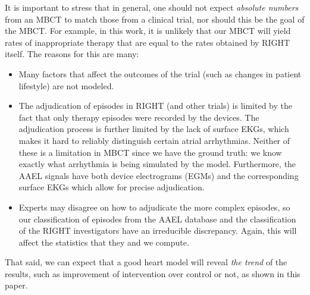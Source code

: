 It is important to stress that in general, one should not expect \emph{absolute numbers} from an MBCT to match those from a clinical trial, nor should this be the goal of the MBCT.
For example, in this work, it is unlikely that our MBCT will yield rates of inappropriate therapy that are equal to the rates obtained by RIGHT itself.
The reasons for this are many:
\begin{itemize}
	\item Many factors that affect the outcomes of the trial (such as changes in patient lifestyle) are not modeled.
	\item The adjudication of episodes in RIGHT (and other trials) is limited by the fact that only therapy episodes were recorded by the devices.
	The adjudication process is further limited by the lack of surface EKGs, which makes it hard to reliably distinguish certain atrial arrhythmias. 
	Neither of these is a limitation in MBCT since we have the ground truth: we know exactly what arrhythmia is being simulated by the model.  Furthermore, the AAEL signals have both device electrograms (EGMs) and the corresponding surface EKGs which allow for precise adjudication.  
	\item Experts may disagree on how to adjudicate the more complex episodes, so our classification of episodes from the AAEL database and the classification of the RIGHT investigators have an irreducible discrepancy.
	Again, this will affect the statistics that they and we compute.
\end{itemize}

That said, we can expect that a good heart model will reveal \emph{the trend} of the results, such as improvement of intervention over control or not, as shown in this paper. 

